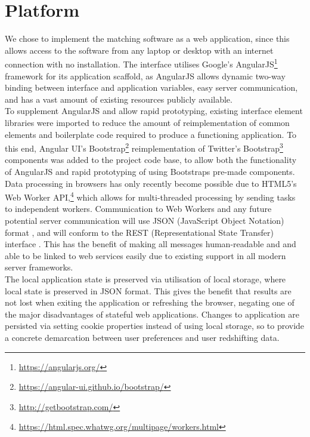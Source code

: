 \documentclass[iop]{emulateapj}
\begin{document}
\section{Platform}

We chose to implement the matching software as a web application, since this allows access to the software from any laptop or desktop with an internet connection with no installation. The interface utilises Google's AngularJS\footnote{\url{https://angularjs.org/}} framework for its application scaffold, as AngularJS allows dynamic two-way binding between interface and application variables, easy server communication, and has a vast amount of existing resources publicly available.\\

To supplement AngularJS and allow rapid prototyping, existing interface element libraries were imported to reduce the amount of reimplementation of common elements and boilerplate code required to produce a functioning application. To this end, Angular UI's Bootstrap\footnote{\url{https://angular-ui.github.io/bootstrap/}} reimplementation of Twitter's Bootstrap\footnote{\url{http://getbootstrap.com/}} components was added to the project code base, to allow both the functionality of AngularJS and rapid prototyping of using Bootstraps pre-made components.\\

Data processing in browsers has only recently become possible due to HTML5's Web Worker API,\footnote{\url{https://html.spec.whatwg.org/multipage/workers.html}} which allows for multi-threaded processing by sending tasks to independent workers. Communication to Web Workers and any future potential server communication will use JSON (JavaScript Object Notation) format \citep{bray2014javascript}, and will conform to the REST (Representational State Transfer) interface \citep{windley11rest}. This has the benefit of making all messages human-readable and and able to be linked to web services easily due to existing support in all modern server frameworks.\\


The local application state is preserved via utilisation of local storage, where local state is preserved in JSON format. This gives the benefit that results are not lost when exiting the application or refreshing the browser, negating one of the major disadvantages of stateful web applications. Changes to application are persisted via setting cookie properties instead of using local storage, so to provide a concrete demarcation between user preferences and user redshifting data.\\
\end{document}
